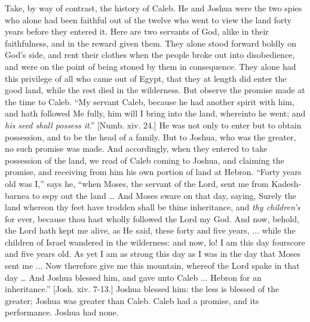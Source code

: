 Take, by way of contrast, the history of Caleb. He and Joshua were
the two spies who alone had been faithful out of the twelve who went
to view the land forty years before they entered it. Here are two
servants of God, alike in their faithfulness, and in the reward given
them. They alone stood forward boldly on God's side, and rent their
clothes when the people broke out into disobedience, and were on the
point of being stoned by them in consequence. They alone had this
privilege of all who came out of Egypt, that they at length did enter
the good land, while the rest died in the wilderness. But observe the
promise made at the time to Caleb. ``My servant Caleb, because he
had another spirit with him, and hath followed Me fully, him will I
bring into the land, whereinto he went; and \emph{his seed shall possess
it}.'' [Numb. xiv. 24.] He was not only to enter but to obtain
possession, and to be the head of a family. But to Joshua, who was the
greater, no such promise was made. And accordingly, when they entered
to take possession of the land, we read of Caleb coming to Joshua, and
claiming the promise, and receiving from him his own portion of land
at Hebron. ``Forty years old was I,'' says he, ``when
Moses, the servant of the Lord, sent me from Kadesh-barnea to espy out
the land … And Moses sware on that day, saying, Surely the land
whereon thy feet have trodden shall be thine inheritance, and \emph{thy
children's} for ever, because thou hast wholly followed the Lord my
God. And now, behold, the Lord hath kept me alive, as He said, these
forty and five years, ... while the children of Israel wandered in the
wilderness: and now, lo! I am this day fourscore and five years old.
As yet I am as strong this day as I was in the day that Moses sent me
... Now therefore give me this mountain, whereof the Lord spake in
that day … And Joshua blessed him, and gave unto Caleb ... Hebron
for an inheritance.'' [Josh. xiv. 7-13.] Joshua blessed him: the
less is blessed of the greater; Joshua was greater than Caleb. Caleb
had a promise, and its performance. Joshua had none.

